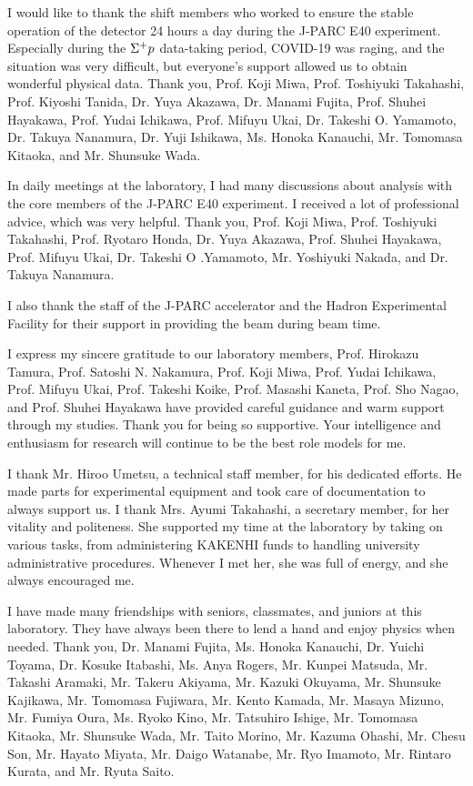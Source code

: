 I would like to thank the shift members who worked to ensure the stable operation of the detector 24 hours a day during the J-PARC E40 experiment. Especially during the $\Sigma^{+}p$ data-taking period, COVID-19 was raging, and the situation was very difficult, but everyone's support allowed us to obtain wonderful physical data. Thank you, Prof. Koji Miwa, Prof. Toshiyuki Takahashi, Prof. Kiyoshi Tanida, Dr. Yuya Akazawa, Dr. Manami Fujita, Prof. Shuhei Hayakawa, Prof. Yudai Ichikawa, Prof. Mifuyu Ukai, Dr. Takeshi O. Yamamoto, Dr. Takuya Nanamura, Dr. Yuji Ishikawa, Ms. Honoka Kanauchi, Mr. Tomomasa Kitaoka, and Mr. Shunsuke Wada.

In daily meetings at the laboratory, I had many discussions about analysis with the core members of the J-PARC E40 experiment. I received a lot of professional advice, which was very helpful. Thank you, Prof. Koji Miwa, Prof. Toshiyuki Takahashi, Prof. Ryotaro Honda, Dr. Yuya Akazawa, Prof. Shuhei Hayakawa, Prof. Mifuyu Ukai, Dr. Takeshi O .Yamamoto, Mr. Yoshiyuki Nakada, and Dr. Takuya Nanamura. 

I also thank the staff of the J-PARC accelerator and the Hadron Experimental Facility for their support in providing the beam during beam time.

I express my sincere gratitude to our laboratory members, Prof. Hirokazu Tamura, Prof. Satoshi N. Nakamura, Prof. Koji Miwa, Prof. Yudai Ichikawa, Prof. Mifuyu Ukai, Prof. Takeshi Koike, Prof. Masashi Kaneta, Prof. Sho Nagao, and Prof. Shuhei Hayakawa have provided careful guidance and warm support through my studies. Thank you for being so supportive. Your intelligence and enthusiasm for research will continue to be the best role models for me.

I thank Mr. Hiroo Umetsu, a technical staff member, for his dedicated efforts. He made parts for experimental equipment and took care of documentation to always support us. I thank Mrs. Ayumi Takahashi, a secretary member, for her vitality and politeness. She supported my time at the laboratory by taking on various tasks, from administering KAKENHI funds to handling university administrative procedures. Whenever I met her, she was full of energy, and she always encouraged me.

I have made many friendships with seniors, classmates, and juniors at this laboratory. They have always been there to lend a hand and enjoy physics when needed. Thank you, Dr. Manami Fujita, Ms. Honoka Kanauchi, Dr. Yuichi Toyama, Dr. Kosuke Itabashi, Ms. Anya Rogers, Mr. Kunpei Matsuda, Mr. Takashi Aramaki, Mr. Takeru Akiyama, Mr. Kazuki Okuyama, Mr. Shunsuke Kajikawa, Mr. Tomomasa Fujiwara, Mr. Kento Kamada, Mr. Masaya Mizuno, Mr. Fumiya Oura, Ms. Ryoko Kino, Mr. Tatsuhiro Ishige, Mr. Tomomasa Kitaoka, Mr. Shunsuke Wada, Mr. Taito Morino, Mr. Kazuma Ohashi, Mr. Chesu Son, Mr. Hayato Miyata, Mr. Daigo Watanabe, Mr. Ryo Imamoto, Mr. Rintaro Kurata, and Mr. Ryuta Saito.

